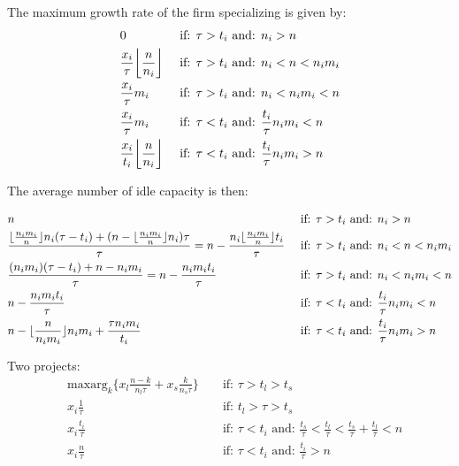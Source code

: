 \documentclass[12pt]{report}
\numberwithin{equation}{section}
\DeclarePairedDelimiter\floor{\lfloor}{\rfloor}
\begin{document}
The maximum growth rate of the firm specializing is given by:
\begin{align*}
& 0 && \text{ if: } \tau > t_i \text{  and: } n_i>n \\
& \frac{x_i}{\tau} \floor*{\frac{n}{n_i}} && \text{ if: } \tau > t_i \text{  and: } n_i<n<n_i m_i \\
&\frac{x_i}{\tau} m_i && \text{ if: } \tau > t_i \text{  and: } n_i<n_im_i<n \\
&\frac{x_i }{\tau} m_i && \text{ if: } \tau < t_i \text{  and: } \frac{t_i}{\tau} n_i m_i<n \\
&\frac{x_i }{t_i} \floor*{\frac{n}{n_i}} && \text{ if: } \tau < t_i \text{  and: } \frac{t_i}{\tau} n_i m_i>n
\end{align*}

The average number of idle capacity is then:  

\begin{align*}
& n && \text{ if: } \tau > t_i \text{  and: } n_i>n \\
& \frac{ \floor{ \frac{n_i m_i}{n}} n_i(\tau - t_i)+(n-\floor{ \frac{n_i m_i}{n}}n_i) \tau }{\tau} = n - \frac{n_i \floor{ \frac{n_i m_i}{n}} t_i}{\tau} && \text{ if: } \tau > t_i \text{  and: } n_i<n<n_i m_i \\
& \frac{(n_i m_i)(\tau - t_i)+n-n_i m_i}{\tau}= n - \frac{n_i m_i t_i}{\tau} && \text{ if: } \tau > t_i \text{  and: } n_i<n_im_i<n \\
& n-\frac{n_i m_i t_i}{\tau} && \text{ if: } \tau < t_i \text{  and: } \frac{t_i}{\tau} n_i m_i<n \\
&n-\floor{\frac{n}{n_im_i}}n_im_i + \frac{\tau n_i m_i}{t_i}  && \text{ if: } \tau < t_i \text{  and: } \frac{t_i}{\tau} n_i m_i>n
\end{align*}

Two projects:
\begin{align*}
& \text{maxarg}_k \{ x_l\frac{n-k}{n_l \tau}+x_s\frac{k}{n_s \tau} \}  && \text{ if: } \tau > t_l>t_s \\
&x_i \frac{1}{\tau} && \text{ if: } t_l> \tau > t_s \\
&x_i \frac{t_i}{\tau} && \text{ if: } \tau < t_i \text{  and: } \frac{t_s}{\tau}<\frac{t_l}{\tau}<\frac{t_s}{\tau}+\frac{t_l}{\tau}<n \\
&x_i \frac{n}{\tau} && \text{ if: } \tau < t_i \text{  and: } \frac{t_i}{\tau}>n
\end{align*}





\end{document}
